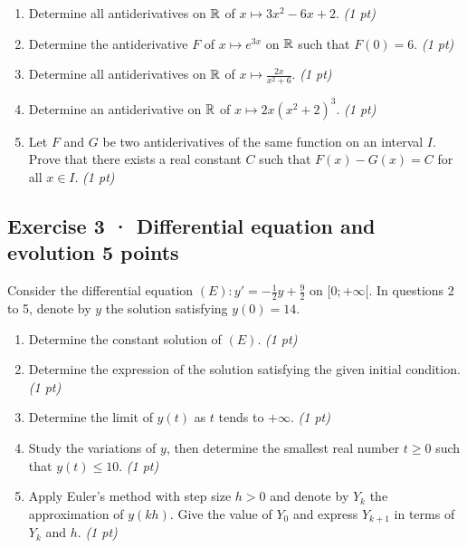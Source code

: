 \begin{enumerate}

\item Determine all antiderivatives on $\mathbb R$ of $x\mapsto 3x^2-6x+2$. \hfill\textit{(1 pt)}

\item Determine the antiderivative $F$ of $x\mapsto e^{3x}$ on $\mathbb R$ such that $F(0)=6$. \hfill\textit{(1 pt)}

\item Determine all antiderivatives on $\mathbb R$ of $x\mapsto\frac{2x}{x^2+6}$. \hfill\textit{(1 pt)}

\item Determine an antiderivative on $\mathbb R$ of $x\mapsto2x(x^2+2)^{3}$. \hfill\textit{(1 pt)}

\item Let $F$ and $G$ be two antiderivatives of the same function on an interval $I$. Prove that there exists a real constant $C$ such that $F(x)-G(x)=C$ for all $x\in I$. \hfill\textit{(1 pt)}

\end{enumerate}

\clearpage{}\par

\subsection*{Exercise 3 · Differential equation and evolution \hfill 5 points}Consider the differential equation $(E):y'=-\frac1{2}y+\frac{9}{2}$ on $[0;+\infty[$. In questions 2 to 5, denote by $y$ the solution satisfying $y(0)=14$.

\begin{enumerate}

\item Determine the constant solution of $(E)$. \hfill\textit{(1 pt)}

\item Determine the expression of the solution satisfying the given initial condition. \hfill\textit{(1 pt)}

\item Determine the limit of $y(t)$ as $t$ tends to $+\infty$. \hfill\textit{(1 pt)}

\item Study the variations of $y$, then determine the smallest real number $t\ge0$ such that $y(t)\le10$. \hfill\textit{(1 pt)}

\item Apply Euler's method with step size $h>0$ and denote by $Y_k$ the approximation of $y(kh)$. Give the value of $Y_0$ and express $Y_{k+1}$ in terms of $Y_k$ and $h$. \hfill\textit{(1 pt)}

\end{enumerate}

